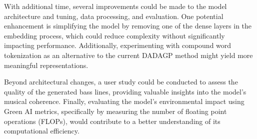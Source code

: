 With additional time, several improvements could be made to the model architecture and tuning, data processing, and evaluation.
One potential enhancement is simplifying the model by removing one of the dense layers in the embedding process, which could reduce complexity without significantly impacting performance.
Additionally, experimenting with compound word tokenization as an alternative to the current DADAGP method might yield more meaningful representations. 

Beyond architectural changes, a user study could be conducted to assess the quality of the generated bass lines, providing valuable insights into the model's musical coherence.
Finally, evaluating the model's environmental impact using Green AI metrics, specifically by measuring the number of floating point operations (FLOPs), would contribute to a better understanding of its computational efficiency.


